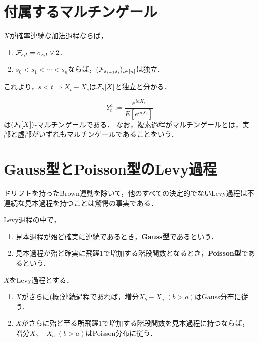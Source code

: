 \documentclass[uplatex,dvipdfmx]{jsreport}
\begin{document}
\section{付属するマルチンゲール}

\begin{theorem}
    $X$が確率連続な加法過程ならば，
    \begin{enumerate}
        \item $\mathcal{F}_{s,t}=\sigma_{s,t}\lor 2$．
        \item $s_0<s_1<\cdots<s_n$ならば，$(\mathcal{F}_{s_{i-1}s_i})_{i\in[n]}$は独立．
    \end{enumerate}
\end{theorem}
\begin{remarks}
    これより，$s<t\Rightarrow X_t-X_s$は$\mathcal{F}_s[X]$と独立と分かる．
\end{remarks}

\begin{proposition}
    \[Y^a_t:=\frac{e^{iaX_i}}{E[e^{iaX_i}]}\]
    は$(\mathcal{F}_t[X])$-マルチンゲールである．
    なお，複素過程がマルチンゲールとは，実部と虚部がいずれもマルチンゲールであることをいう．
\end{proposition}

\section{Gauss型とPoisson型のLevy過程}

\begin{tcolorbox}[colframe=ForestGreen, colback=ForestGreen!10!white,breakable,colbacktitle=ForestGreen!40!white,coltitle=black,fonttitle=\bfseries\sffamily,
title=]
    ドリフトを持ったBrown運動を除いて，他のすべての決定的でないLevy過程は不連続な見本過程を持つことは驚愕の事実である．
\end{tcolorbox}

\begin{definition}
    Levy過程の中で，
    \begin{enumerate}
        \item 見本過程が殆ど確実に連続であるとき，\textbf{Gauss型}であるという．
        \item 見本過程が殆ど確実に飛躍$1$で増加する階段関数となるとき，\textbf{Poisson型}であるという．
    \end{enumerate}
\end{definition}

\begin{theorem}[Gauss型とPoisson型Levy過程]
    $X$をLevy過程とする．
    \begin{enumerate}
        \item $X$がさらに(概)連続過程であれば，増分$X_b-X_a\;(b>a)$はGauss分布に従う．
        \item $X$がさらに殆ど至る所飛躍$1$で増加する階段関数を見本過程に持つならば，増分$X_b-X_a\;(b>a)$はPoisson分布に従う．
    \end{enumerate}
\end{theorem}
\end{document}
